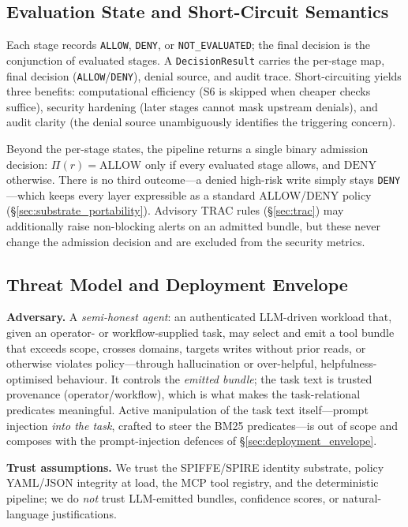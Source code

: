 \documentclass[sigconf,review,anonymous]{acmart}
\begin{document}
\subsection{Evaluation State and Short-Circuit Semantics}
\label{sec:state_model}

Each stage records \texttt{ALLOW}, \texttt{DENY}, or \texttt{NOT\_EVALUATED}; the final decision is the conjunction of evaluated stages. A \texttt{DecisionResult} carries the per-stage map, final decision (\texttt{ALLOW}/\texttt{DENY}), denial source, and audit trace. Short-circuiting yields three benefits: computational efficiency (S6 is skipped when cheaper checks suffice), security hardening (later stages cannot mask upstream denials), and audit clarity (the denial source unambiguously identifies the triggering concern).

Beyond the per-stage states, the pipeline returns a single binary admission decision: $\Pi(r)=\text{ALLOW}$ only if every evaluated stage allows, and $\text{DENY}$ otherwise. There is no third outcome---a denied high-risk write simply stays \texttt{DENY}---which keeps every layer expressible as a standard ALLOW/DENY policy (\S\ref{sec:substrate_portability}). Advisory TRAC rules (\S\ref{sec:trac}) may additionally raise non-blocking alerts on an admitted bundle, but these never change the admission decision and are excluded from the security metrics.

\subsection{Threat Model and Deployment Envelope}
\label{sec:threat_model}

\textbf{Adversary.} A \emph{semi-honest agent}: an authenticated LLM-driven workload that, given an operator- or workflow-supplied task, may select and emit a tool bundle that exceeds scope, crosses domains, targets writes without prior reads, or otherwise violates policy---through hallucination or over-helpful, helpfulness-optimised behaviour. It controls the \emph{emitted bundle}; the task text is trusted provenance (operator/workflow), which is what makes the task-relational predicates meaningful. Active manipulation of the task text itself---prompt injection \emph{into the task}, crafted to steer the BM25 predicates---is out of scope and composes with the prompt-injection defences of \S\ref{sec:deployment_envelope}.

\textbf{Trust assumptions.} We trust the SPIFFE/SPIRE identity substrate, policy YAML/JSON integrity at load, the MCP tool registry, and the deterministic pipeline; we do \emph{not} trust LLM-emitted bundles, confidence scores, or natural-language justifications.
\end{document}
